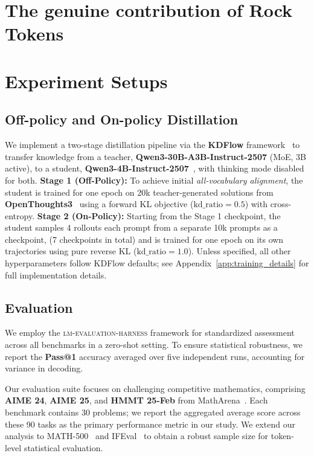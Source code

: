 \documentclass{article}
\begin{document}



\section{The genuine contribution of Rock Tokens} 
\label{sec:rq3}



\section{Experiment Setups}
\label{setup}
\subsection{Off-policy and On-policy Distillation}
\label{sec:training_setup}

We implement a two-stage distillation pipeline via the \textbf{KDFlow} framework~\cite{zhang2026kdflow} to transfer knowledge from a teacher, \textbf{Qwen3-30B-A3B-Instruct-2507} (MoE, 3B active), to a student, \textbf{Qwen3-4B-Instruct-2507}~\cite{qwen3technicalreport}, with thinking mode disabled for both. 
\textbf{Stage 1 (Off-Policy):} To achieve initial \textit{all-vocabulary alignment}, the student is trained for one epoch on 20k teacher-generated solutions from \textbf{OpenThoughts3}~\cite{guha2025openthoughts} using a forward KL objective ($\text{kd\_ratio}=0.5$) with cross-entropy. 
\textbf{Stage 2 (On-Policy):} Starting from the Stage 1 checkpoint, the student samples 4 rollouts each prompt from a separate 10k prompts as a checkpoint, (7 checkpoints in total)  and is trained for one epoch on its own trajectories using pure reverse KL ($\text{kd\_ratio}=1.0$). 
Unless specified, all other hyperparameters follow KDFlow defaults; see Appendix~\ref{app:training_details} for full implementation details.
\subsection{Evaluation}
We employ the \textsc{lm-evaluation-harness} framework \cite{eval-harness} for standardized assessment across all benchmarks in a zero-shot setting. To ensure statistical robustness, we report the \textbf{Pass@1} accuracy averaged over five independent runs, accounting for variance in decoding.

Our evaluation suite focuses on challenging competitive mathematics, comprising \textbf{AIME 24}, \textbf{AIME 25}, and \textbf{HMMT 25-Feb} from MathArena~\cite{dekoninck2026matharena}. Each benchmark contains 30 problems; we report the aggregated average score across these 90 tasks as the primary performance metric in our study. We extend our analysis to MATH-500~\cite{lightman2023letsverifystepstep} and IFEval~\cite{zhou2023instruction} to obtain a robust sample size for token-level statistical evaluation.
\end{document}
